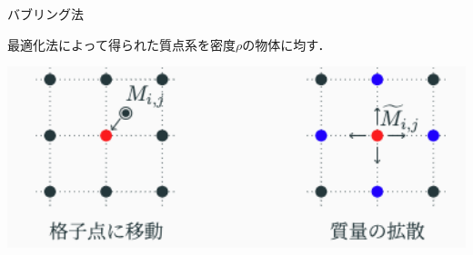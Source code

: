 \documentclass[a0paper,dvipdfmx,helvet,logo=logo.png,hlcolor=F70146]{modernposter}
\begin{document}
\begin{postercolumn}
  {バブリング法}{
  最適化法によって得られた質点系を密度$\rho$の物体に均す．
  \vspace{1.2cm}
  \begin{center}
    \includegraphics[width=17cm]{fig3/move_pms.png}








\end{center}}
\end{postercolumn}
\end{document}
